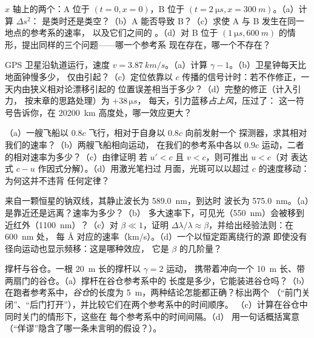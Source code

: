 \begin{exercise}[$\star$]\label{exo:b3:relativistic-kinematics:4}
$x$ 轴上的两个：A 位于 $(t = 0, x = 0)$，B 位于 $(t =
\qty{2}{\micro s}, x = \qty{300}{m})$。（a）计算 $\Delta s^2$：
是类时还是类空？（b）A 能否导致 B？（c）求使 A 与 B 发生在同一地点的参考系的速率，
以及它们之间的
。（d）对 B 位于
$(\qty{1}{\micro s}, \qty{600}{m})$ 的情形，提出同样的三个问题——哪一个参考系
现在存在，哪一个不存在？
\end{exercise}

\begin{exercise}[$\star\star$]\label{exo:b3:relativistic-kinematics:5}
GPS 卫星沿轨道运行，速度 $v = \qty{3.87}{km/s}$。（a）计算 $\gamma -
1$。（b）卫星钟每天比地面钟慢多少，
仅由引起？（c）定位依靠以
$c$ 传播的信号计时：若不作修正，一天内由狭义相对论漂移引起的
位置误差相当于多少？（d）完整的修正（计入引力，
按末章的思路处理）为 $+38\,\unit{\micro s}$，
每天，引力蓝移\emph{占上风}，压过了：
这一符号告诉你，在 
\qty{20200}{km} 高度处，哪一效应更大？
\end{exercise}

\begin{exercise}[$\star\star$]\label{exo:b3:relativistic-kinematics:6}
（a）一艘飞船以 $0.8c$ 飞行，相对于自身以 $0.8c$ 向前发射一个
探测器，求其相对我们的速率？（b）两艘飞船相向运动，
在我们的参考系中各以 $0.9c$ 运动，二者的相对速率为多少？（c）由律证明
若 $u' < c$ 且 $v < c$，则可推出 $u < c$（对
表达式 $c - u$ 作因式分解）。（d）用激光笔扫过
月面，光斑可以以超过 $c$ 的速度移动：为何这并不违背
任何定律？
\end{exercise}

\begin{exercise}[$\star\star$]\label{exo:b3:relativistic-kinematics:7}
来自一颗恒星的钠双线，其静止波长为 \qty{589.0}{nm}，到达时
波长为 \qty{575.0}{nm}。（a）是靠近还是远离？速率为多少？（b）
多大速率下，可见光（\qty{550}{nm}）会被移到
近红外（\qty{1100}{nm}）？（c）对 $\beta \ll 1$，证明
$\Delta\lambda/\lambda \approx \beta$，并给出经验法则：在 \qty{600}{nm} 处，
每 \unit{\angstrom} 对应的速率（km/s）。（d）一个以恒定距离绕行的源
即使没有径向运动也显示频移：这是哪种效应，
它是 $\beta$ 的几阶量？
\end{exercise}

\begin{exercise}[$\star\star$]\label{exo:b3:relativistic-kinematics:8}
撑杆与谷仓。一根 \qty{20}{m} 长的撑杆以 $\gamma = 2$ 运动，
携带着冲向一个 \qty{10}{m} 长、带两扇门的谷仓。（a）撑杆在谷仓参考系中的
长度是多少，它能装进谷仓吗？（b）在跑者参考系中，\emph{谷仓}的长度为
\qty{5}{m}，两种结论怎能都正确？标出两个
（“前门关闭”、“后门打开”），并比较它们在两个参考系中的时间顺序。
（c）计算在谷仓中同时关门的情形下，这些在
每个参考系中的时间间隔。（d）
用一句话概括寓意（“佯谬”隐含了哪一条未言明的假设？）。
\end{exercise}

